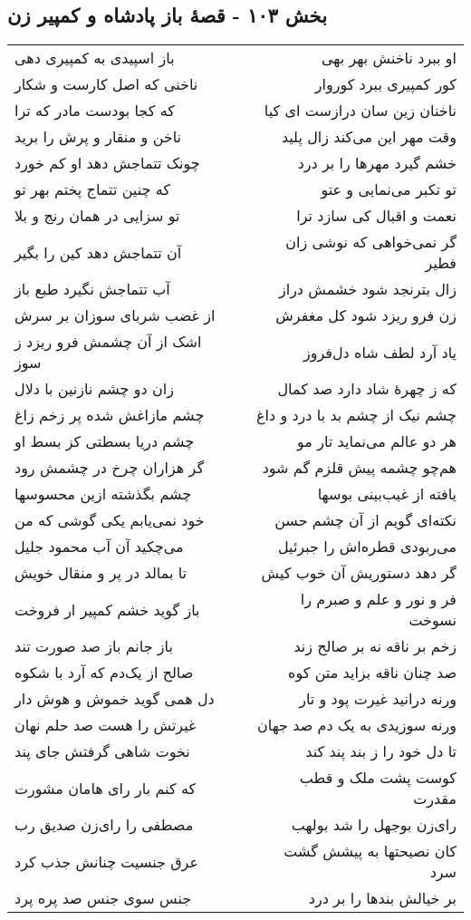 \begin{center}
\section*{بخش ۱۰۳ - قصهٔ باز پادشاه و کمپیر زن}
\label{sec:sh103}
\begin{longtable}{l p{0.5cm} r}
باز اسپیدی به کمپیری دهی
&&
او ببرد ناخنش بهر بهی
\\
ناخنی که اصل کارست و شکار
&&
کور کمپیری ببرد کوروار
\\
که کجا بودست مادر که ترا
&&
ناخنان زین سان درازست ای کیا
\\
ناخن و منقار و پرش را برید
&&
وقت مهر این می‌کند زال پلید
\\
چونک تتماجش دهد او کم خورد
&&
خشم گیرد مهرها را بر درد
\\
که چنین تتماج پختم بهر تو
&&
تو تکبر می‌نمایی و عتو
\\
تو سزایی در همان رنج و بلا
&&
نعمت و اقبال کی سازد ترا
\\
آن تتماجش دهد کین را بگیر
&&
گر نمی‌خواهی که نوشی زان فطیر
\\
آب تتماجش نگیرد طبع باز
&&
زال بترنجد شود خشمش دراز
\\
از غضب شربای سوزان بر سرش
&&
زن فرو ریزد شود کل مغفرش
\\
اشک از آن چشمش فرو ریزد ز سوز
&&
یاد آرد لطف شاه دل‌فروز
\\
زان دو چشم نازنین با دلال
&&
که ز چهرهٔ شاد دارد صد کمال
\\
چشم مازاغش شده پر زخم زاغ
&&
چشم نیک از چشم بد با درد و داغ
\\
چشم دریا بسطتی کز بسط او
&&
هر دو عالم می‌نماید تار مو
\\
گر هزاران چرخ در چشمش رود
&&
هم‌چو چشمه پیش قلزم گم شود
\\
چشم بگذشته ازین محسوسها
&&
یافته از غیب‌بینی بوسها
\\
خود نمی‌یابم یکی گوشی که من
&&
نکته‌ای گویم از آن چشم حسن
\\
می‌چکید آن آب محمود جلیل
&&
می‌ربودی قطره‌اش را جبرئیل
\\
تا بمالد در پر و منقال خویش
&&
گر دهد دستوریش آن خوب کیش
\\
باز گوید خشم کمپیر ار فروخت
&&
فر و نور و علم و صبرم را نسوخت
\\
باز جانم باز صد صورت تند
&&
زخم بر ناقه نه بر صالح زند
\\
صالح از یک‌دم که آرد با شکوه
&&
صد چنان ناقه بزاید متن کوه
\\
دل همی گوید خموش و هوش دار
&&
ورنه درانید غیرت پود و تار
\\
غیرتش را هست صد حلم نهان
&&
ورنه سوزیدی به یک دم صد جهان
\\
نخوت شاهی گرفتش جای پند
&&
تا دل خود را ز بند پند کند
\\
که کنم بار رای هامان مشورت
&&
کوست پشت ملک و قطب مقدرت
\\
مصطفی را رای‌زن صدیق رب
&&
رای‌زن بوجهل را شد بولهب
\\
عرق جنسیت چنانش جذب کرد
&&
کان نصیحتها به پیشش گشت سرد
\\
جنس سوی جنس صد پره پرد
&&
بر خیالش بندها را بر درد
\\
\end{longtable}
\end{center}

